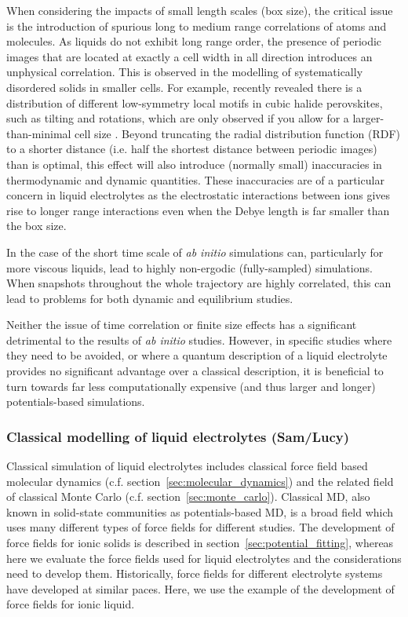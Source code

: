 \documentclass[../main.tex]{subfiles}
\begin{document}
When considering the impacts of small length scales (box size), the critical issue is the introduction of spurious long to medium range correlations of atoms and molecules. As liquids do not exhibit long range order, the presence of periodic images that are located at exactly a cell width in all direction introduces an unphysical correlation. This is observed in the modelling of systematically disordered solids in smaller cells\cite{Morgan_2011}. For example, \citeauthor{Zhao_2020} recently revealed there is a distribution of different low-symmetry local motifs in cubic halide perovskites, such as tilting and rotations, which are only observed if you allow for a larger-than-minimal cell size \cite{Zhao_2020}. Beyond truncating the radial distribution function (RDF) to a shorter distance (i.e. half the shortest distance between periodic images) than is optimal, this effect will also introduce (normally small) inaccuracies in thermodynamic and dynamic quantities\cite{Binder2009book, yeh_system-size_2004, botan_diffusion_2015, horbach_finite_1996}. These inaccuracies are of a particular concern in liquid electrolytes as the electrostatic interactions between ions gives rise to longer range interactions even when the Debye length is far smaller than the box size\cite{coles_correlation_2020}.

In the case of the short time scale of \textit{ab initio} simulations can, particularly for more viscous liquids, lead to highly non-ergodic (fully-sampled) simulations. When snapshots throughout the whole trajectory are highly correlated\cite{frenkel_understanding_2002}, this can lead to problems for both dynamic and equilibrium studies. 

Neither the issue of time correlation or finite size effects has a significant detrimental to the results of \textit{ab initio} studies. However, in specific studies where they need to be avoided, or where a quantum description of a liquid electrolyte provides no significant advantage over a classical description, it is beneficial to turn towards far less computationally expensive (and thus larger and longer) potentials-based simulations.

\subsubsection{Classical modelling of liquid electrolytes (Sam/Lucy)}
\label{sec:electrolyte_classicMD}
Classical simulation of liquid electrolytes includes classical force field based molecular dynamics (c.f. section~\ref{sec:molecular_dynamics}) and the related field of classical Monte Carlo (c.f. section~\ref{sec:monte_carlo}). Classical MD, also known in solid-state communities as potentials-based MD, is a broad field which uses many different types of force fields for different studies. The development of force fields for ionic solids is described in section~\ref{sec:potential_fitting}, whereas here we evaluate the force fields used for liquid electrolytes and the considerations need to develop them. Historically, force fields for different electrolyte systems have developed at similar paces. Here, we use the example of the development of force fields for ionic liquid.
\end{document}
